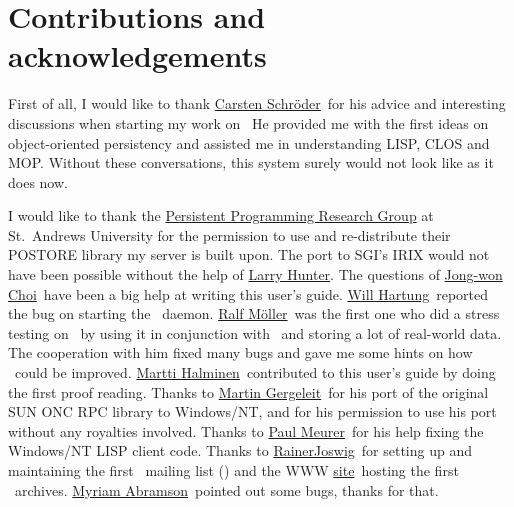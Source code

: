 \chapter{Contributions and acknowledgements}

First of all, I would like to thank
\href{mailto:schroeder@acm.org}{Carsten Schr\"{o}der}\ for his advice and interesting discussions when starting my work on
\plob\ He provided me with the first ideas on object-oriented
persistency and assisted me in understanding LISP, CLOS and MOP.
Without these conversations, this system surely would not look like as
it does now.

I would like to thank the
\href{http://www-ppg.dcs.st-andrew.ac.uk/Default.html}{Persistent
  Programming Research Group} at St.\ Andrews University for the
permission to use and re-distribute their POSTORE library my server is
built upon.  The port to SGI's IRIX would not have been possible
without the help of \href{mailto:hunter@work.nlm.nih.gov}{Larry
  Hunter}.  The questions of
\href{mailto:jwchoi@lgsemicon.co.kr}{Jong-won Choi}\ have been a big
help at writing this user's guide.
\href{mailto:vfr750@netcom.com}{Will Hartung}\ reported the bug on
starting the \ daemon.
\href{mailto:moeller@informatik.uni-hamburg.de}{Ralf M\"{o}ller}\ was
the first one who did a stress testing on \plob\ by using it in
conjunction with \ and storing a lot of real-world data.
The cooperation with him fixed many bugs and gave me some hints on how
\plob\ could be improved.  \href{mailto:mha@dpe.fi}{Martti Halminen}\ 
contributed to this user's guide by doing the first proof reading.
Thanks to \href{mailto:gergeleit@gmd.de}{Martin Gergeleit}\ for his
port of the original SUN ONC RPC library to Windows/NT, and for his
permission to use his port without any royalties involved. Thanks to
\href{mailto:paul.meurer@hit.uib.no}{Paul Meurer}\ for his help fixing
the Windows/NT LISP client code.  Thanks to
\href{mailto:joswig@lispmachine.de}{RainerJoswig}\ for setting up and
maintaining the first \plob\ mailing list (\lisp{plob@lisp.de})
and the WWW \href{http://www.lisp.de}{site}\ hosting the first \plob\ 
archives. \href{mabramso@nlm.nih.gov}{Myriam Abramson}\ pointed out
some bugs, thanks for that.

